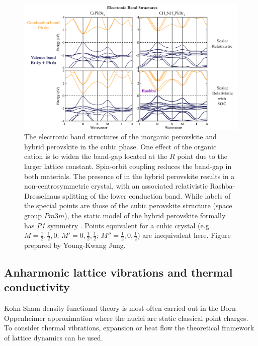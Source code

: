\begin{figure} \label{f3}
\includegraphics[width=1.0\columnwidth]{./figures/ch2/f3.png}
\caption[Electronic band structures of  and ]{
The electronic band structures of the inorganic perovskite  and hybrid perovskite  in the cubic phase.
    One effect of the organic cation is to widen the band-gap located at the $R$ point due to the larger lattice constant. 
    Spin-orbit coupling reduces the band-gap in both materials. 
The presence of  in the hybrid perovskite results in a non-centrosymmetric crystal, with an associated relativistic Rashba-Dresselhaus splitting of the lower conduction band.
While labels of the special points are those of the cubic perovskite structure (space group $Pm\bar{3}m$),  
    the static model of the hybrid perovskite formally has  \textit{P1} symmetry . 
Points equivalent for a cubic crystal (e.g. $M=\frac{1}{2},\frac{1}{2},0$; $M'=0, \frac{1}{2},\frac{1}{2}$;  $M''=\frac{1}{2},0,\frac{1}{2}$) are inequivalent here. Figure prepared by Young-Kwang Jung.
}
\label{fig3}
\end{figure}

\subsection{Anharmonic lattice vibrations and thermal conductivity} \label{ch2anharmonic}

Kohn-Sham density functional theory is most often carried out in the Born-Oppenheimer approximation where the nuclei are static classical point charges. 
To consider thermal vibrations, expansion or heat flow the theoretical framework of lattice dynamics can be used.\autocite{Stoffel2010} 
 
